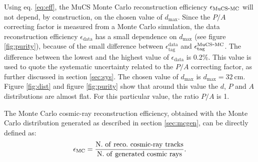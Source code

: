 \documentclass[a4paper,11pt]{article}
\def\myhyphen{{\hbox{-}}}
\begin{document}
Using eq. \eqref{eq:eff}, the MuCS Monte Carlo reconstruction efficiency $\epsilon_{\mathrm{MuCS\myhyphen MC}}$ will not depend, by construction, on the chosen value of $d_{\mathrm{max}}$. Since the $P/A$ correcting factor is measured from a Monte Carlo simulation, the data reconstruction efficiency $\epsilon_{\mathrm{data}}$ has a small dependence on $d_{\mathrm{max}}$ (see figure \ref{fig:purity}), because of the small difference between $\epsilon^{\mathrm{data}}_{\mathrm{tag}}$ and $\epsilon^{\mathrm{MuCS\myhyphen MC}}_{\mathrm{tag}}$.
The difference between the lowest and the highest value of $\epsilon_{\mathrm{data}}$ is 0.2\%. This value is used to quote the systematic uncertainty related to the $P/A$ correcting factor, as further discussed in section \ref{sec:sys}.
The chosen value of $d_{\mathrm{max}}$ is $d_{\mathrm{max}}=32~\mathrm{cm}$. Figure \ref{fig:dist} and figure \ref{fig:purity} show that around this value the $d$, $P$ and $A$ distributions are almost flat. For this particular value,  the ratio $P/A$ is 1.%




The Monte Carlo cosmic-ray reconstruction efficiency, obtained with the Monte Carlo distribution generated as described in section \ref{sec:mcgen}, can be directly defined as:
\begin{equation}
  \epsilon_{\mathrm{MC}} = \frac{\mathrm{N.~of~reco.~cosmic\myhyphen ray~tracks}}{\mathrm{N.~of~generated~cosmic~rays}}.
\end{equation}
\end{document}
